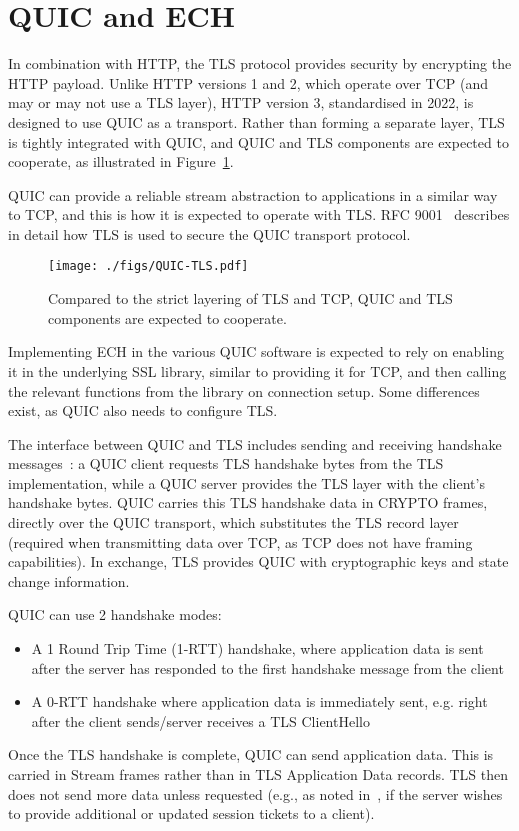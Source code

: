 \section{QUIC and ECH}

In combination with HTTP, the TLS protocol provides security by encrypting the HTTP payload. 
Unlike HTTP versions 1 and 2, which operate over TCP (and may or may not use a TLS layer),
HTTP version 3, standardised in 2022, is designed to use QUIC as a transport.
Rather than forming a separate layer, TLS is tightly integrated with QUIC, and QUIC and TLS components are expected to cooperate, as illustrated in Figure~\ref{fig:quic-tls}.

QUIC can provide a reliable stream abstraction to applications in a similar way to TCP, and this is how it is expected to operate with TLS. 
RFC 9001~\cite{rfc9001} describes in detail how TLS is used to secure the QUIC transport protocol. 

\begin{figure}[h]
    \centering
    \texttt{[image: ./figs/QUIC-TLS.pdf]}
    \caption{Compared to the strict layering of TLS and TCP, QUIC and TLS components are expected to cooperate.}
    \label{fig:quic-tls}
\end{figure}

Implementing ECH in the various QUIC software is expected to rely on enabling it in the underlying SSL library, similar to providing it for TCP, and then calling the relevant functions from the library on connection setup.
Some differences exist, as QUIC also needs to configure TLS.

The interface between QUIC and TLS includes sending and receiving handshake messages~\cite{rfc9001}:
a QUIC client requests TLS handshake bytes from the TLS implementation, while a QUIC server provides the TLS layer with the client's handshake bytes. QUIC carries this TLS handshake data in CRYPTO frames, directly over the QUIC transport, which substitutes the TLS record layer (required when transmitting data over TCP, as TCP does not have framing capabilities).
In exchange, TLS provides QUIC with cryptographic keys and state change information.

QUIC can use 2 handshake modes:
\begin{itemize}
    \item  A 1 Round Trip Time (1-RTT) handshake, where application data is sent after the server has responded to the first handshake message from the client
     \item A 0-RTT handshake where application data is immediately sent, e.g. right after the client sends/server receives a TLS ClientHello
\end{itemize}

Once the TLS handshake is complete, QUIC can send application data. This is carried in Stream frames rather than in TLS Application Data records. TLS then does not send more data unless requested (e.g., as noted in~\cite{rfc9001}, if the server wishes to provide additional or updated session tickets to a client).
